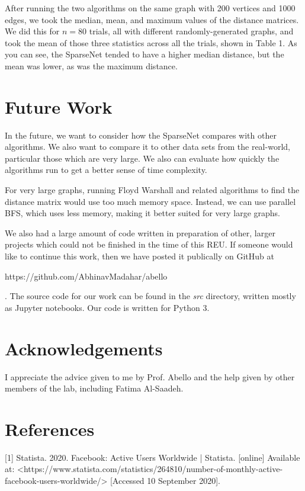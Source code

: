 \documentclass[conference]{IEEEtran}
\begin{document}
After running the two algorithms on the same graph with 200 vertices and 1000 edges, we took the median, mean, and maximum values of the distance matrices.
We did this for $n=80$ trials, all with different randomly-generated graphs, and took the mean of those three statistics across all the trials, shown in Table 1.
As you can see, the SparseNet tended to have a higher median distance, but the mean was lower, as was the maximum distance.

\section{Future Work}

In the future, we want to consider how the SparseNet compares with other algorithms.
We also want to compare it to other data sets from the real-world, particular those which are very large.
We also can evaluate how quickly the algorithms run to get a better sense of time complexity.

For very large graphs, running Floyd Warshall and related algorithms to find the distance matrix would use too much memory space.
Instead, we can use parallel BFS, which uses less memory, making it better suited for very large graphs.

We also had a large amount of code written in preparation of other, larger projects which could not be finished in the time of this REU.
If someone would like to continue this work, then we have posted it publically on GitHub at \begin{href}https://github.com/AbhinavMadahar/abello\end{href}.
The source code for our work can be found in the \textit{src} directory, written mostly as Jupyter notebooks.
Our code is written for Python 3.

\section{Acknowledgements}

I appreciate the advice given to me by Prof. Abello and the help given by other members of the lab, including Fatima Al-Saadeh.

\section{References}

[1] Statista. 2020. Facebook: Active Users Worldwide | Statista. [online] Available at: <https://www.statista.com/statistics/264810/number-of-monthly-active-facebook-users-worldwide/> [Accessed 10 September 2020].
\end{document}
